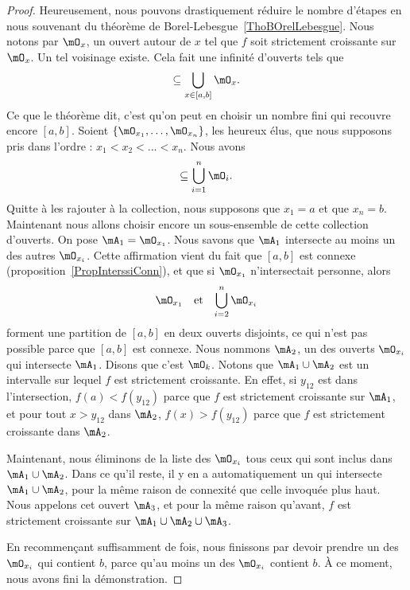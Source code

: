 \begin{proof}
    Heureusement, nous pouvons drastiquement réduire le nombre d'étapes en nous souvenant du théorème de Borel-Lebesgue~\ref{ThoBOrelLebesgue}. Nous notons par $\mO_x$, un ouvert autour de $x$ tel que $f$ soit strictement croissante sur $\mO_x$. Un tel voisinage existe. Cela fait une infinité d'ouverts tels que
    \begin{equation}
        [a,b]\subseteq\bigcup_{x\in[a,b]}\mO_x.
    \end{equation}
    Ce que le théorème dit, c'est qu'on peut en choisir un nombre fini qui recouvre encore $[a,b]$. Soient $\{ \mO_{x_1},\ldots,\mO_{x_n} \}$, les heureux élus, que nous supposons pris dans l'ordre : $x_1<x_2<\ldots<x_n$. Nous avons
    \begin{equation}
        [a,b]\subseteq\bigcup_{i=1}^n\mO_i.
    \end{equation}
    Quitte à les rajouter à la collection, nous supposons que $x_1=a$ et que $x_n=b$. Maintenant nous allons choisir encore un sous-ensemble de cette collection d'ouverts. On pose $\mA_1=\mO_{x_1}$. Nous savons que $\mA_1$ intersecte au moins un des autres $\mO_{x_i}$. Cette affirmation vient du fait que $[a,b]$ est connexe (proposition~\ref{PropInterssiConn}), et que si $\mO_{x_1}$ n'intersectait personne, alors
    \begin{equation}
        \begin{aligned}[]
            \mO_{x_1}&&\text{et}&&\bigcup_{i=2}^n\mO_{x_i}
        \end{aligned}
    \end{equation}
    forment une partition de $[a,b]$ en deux ouverts disjoints, ce qui n'est pas possible parce que $[a,b]$ est connexe. Nous nommons $\mA_2$, un des ouverts $\mO_{x_i}$ qui intersecte $\mA_1$. Disons que c'est $\mO_k$. Notons que $\mA_1\cup\mA_2$ est un intervalle sur lequel $f$ est strictement croissante. En effet, si $y_{12}$ est dans l'intersection, $f(a)<f(y_{12})$ parce que $f$ est strictement croissante sur $\mA_1$, et pour tout $x>y_{12}$ dans $\mA_2$, $f(x)>f(y_{12})$ parce que $f$ est strictement croissante dans $\mA_2$.

    Maintenant, nous éliminons de la liste des $\mO_{x_i}$ tous ceux qui sont inclus dans $\mA_1\cup\mA_2$. Dans ce qu'il reste, il y en a automatiquement un qui intersecte $\mA_1\cup\mA_2$, pour la même raison de connexité que celle invoquée plus haut. Nous appelons cet ouvert $\mA_3$, et pour la même raison qu'avant, $f$ est strictement croissante sur $\mA_1\cup\mA_2\cup\mA_3$.

    En recommençant suffisamment de fois, nous finissons par devoir prendre un des $\mO_{x_i}$ qui contient $b$, parce qu'au moins un des $\mO_{x_i}$ contient $b$. À ce moment, nous avons fini la démonstration.
\end{proof}

